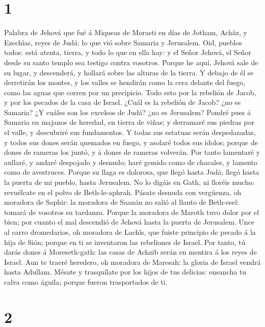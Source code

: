 \hypertarget{section}{%
\section{1}\label{section}}

 Palabra de Jehová que fué á Miqueas de Morasti en días de
Jotham, Achâz, y Ezechîas, reyes de Judá: lo que vió sobre Samaria y
Jerusalem.  Oid, pueblos todos: está atenta, tierra, y
todo lo que en ella hay: y el Señor Jehová, el Señor desde su santo
templo sea testigo contra vosotros.  Porque he aquí,
Jehová sale de su lugar, y descenderá, y hollará sobre las alturas de la
tierra.  Y debajo de él se derretirán los montes, y los
valles se hendirán como la cera delante del fuego, como las aguas que
corren por un precipicio.  Todo esto por la rebelión de
Jacob, y por los pecados de la casa de Israel. ¿Cuál es la rebelión de
Jacob? ¿no es Samaria? ¿Y cuáles son los excelsos de Judá? ¿no es
Jerusalem?  Pondré pues á Samaria en majanos de heredad,
en tierra de viñas; y derramaré sus piedras por el valle, y descubriré
sus fundamentos.  Y todas sus estatuas serán despedazadas,
y todos sus dones serán quemados en fuego, y asolaré todos sus ídolos;
porque de dones de rameras los juntó, y á dones de rameras volverán.
 Por tanto lamentaré y aullaré, y andaré despojado y
desnudo; haré gemido como de chacales, y lamento como de avestruces.
 Porque su llaga es dolorosa, que llegó hasta Judá; llegó
hasta la puerta de mi pueblo, hasta Jerusalem.  No lo
digáis en Gath, ni lloréis mucho: revuélcate en el polvo de
Beth-le-aphrah.  Pásate desnuda con vergüenza, oh
moradora de Saphir: la moradora de Saanán no salió al llanto de
Beth-esel: tomará de vosotros su tardanza.  Porque la
moradora de Maroth tuvo dolor por el bien; por cuanto el mal descendió
de Jehová hasta la puerta de Jerusalem.  Unce al carro
dromedarios, oh moradora de Lachîs, que fuiste principio de pecado á la
hija de Sión; porque en ti se inventaron las rebeliones de Israel.
 Por tanto, tú darás dones á Moreseth-gath: las casas de
Achzib serán en mentira á los reyes de Israel.  Aun te
traeré heredero, oh moradora de Maresah: la gloria de Israel vendrá
hasta Adullam.  Mésate y trasquílate por los hijos de tus
delicias: ensancha tu calva como águila; porque fueron trasportados de
ti.

\hypertarget{section-1}{%
\section{2}\label{section-1}}


